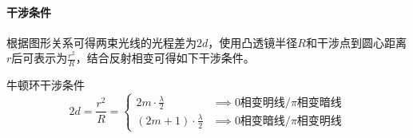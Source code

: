 \paragraph{干涉条件}根据图形关系可得两束光线的光程差为$2d$，使用凸透镜半径$R$和干涉点到圆心距离$r$后可表示为$\frac{r^2}{R}$，结合反射相变可得如下干涉条件。
\begin{itembox}[l]{牛顿环干涉条件}
    \begin{equation*}
        2d=\frac{r^2}{R}=
        \begin{cases}
            2m\cdot\frac{\lambda}{2}&\implies
            \textrm{0相变明线/}\pi\textrm{相变暗线}\\
            (2m+1)\cdot\frac{\lambda}{2}&\implies
            \textrm{0相变暗线/}\pi\textrm{相变明线}
        \end{cases}
    \end{equation*}
\end{itembox}
